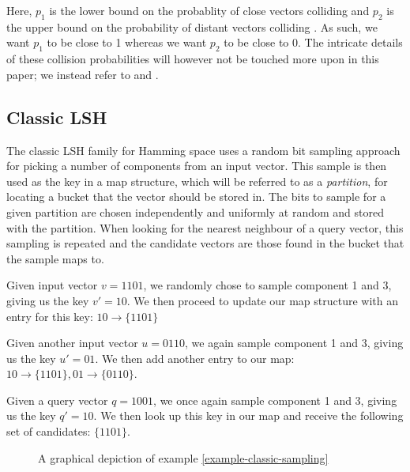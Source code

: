 Here, $p_1$ is the lower bound on the probablity of close vectors colliding and $p_2$ is the upper bound on the probability of distant vectors colliding \cite[p. 100]{DBLP:books/cu/LeskovecRU14}. As such, we want $p_1$ to be close to 1 whereas we want $p_2$ to be close to 0. The intricate details of these collision probabilities will however not be touched more upon in this paper; we instead refer to \cite{DBLP:conf/stoc/IndykM98} and \cite{DBLP:books/cu/LeskovecRU14}.

\subsection{Classic LSH}
\label{background-classic-lsh}

The classic LSH family for Hamming space uses a random bit sampling approach for picking a number of components from an input vector. This sample is then used as the key in a map structure, which will be referred to as a \textit{partition}, for locating a bucket that the vector should be stored in. The bits to sample for a given partition are chosen independently and uniformly at random and stored with the partition. When looking for the nearest neighbour of a query vector, this sampling is repeated and the candidate vectors are those found in the bucket that the sample maps to.

\begin{example}
\label{example-classic-sampling}
Given input vector $v = 1101$, we randomly chose to sample component 1 and 3, giving us the key $v' = 10$. We then proceed to update our map structure with an entry for this key: $10 \rightarrow \{1101\}$

Given another input vector $u = 0110$, we again sample component 1 and 3, giving us the key $u' = 01$. We then add another entry to our map: $10 \rightarrow \{1101\}, 01 \rightarrow \{0110\}$.

Given a query vector $q = 1001$, we once again sample component 1 and 3, giving us the key $q' = 10$. We then look up this key in our map and receive the following set of candidates: $\{1101\}$.
\end{example}

\begin{figure}[ht]
  \centering

  \caption{A graphical depiction of example \ref{example-classic-sampling}}
  \label{figure-classic-sampling}
\end{figure}

